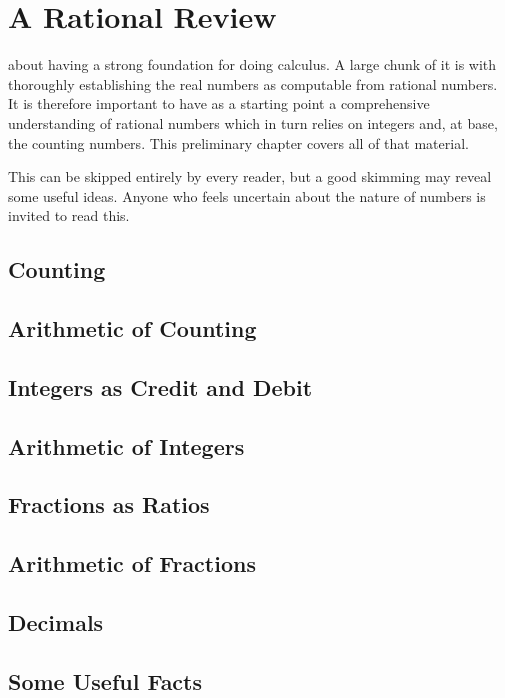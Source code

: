 \chapter*{A Rational Review}

 about having a strong foundation for doing calculus. A large chunk of it is with thoroughly establishing the real numbers as computable from rational numbers. It is therefore important to have as a starting point a comprehensive understanding of rational numbers which in turn relies on integers and, at base, the counting numbers. This preliminary chapter covers all of that material. 

This can be skipped entirely by every reader, but a good skimming may reveal some useful ideas. Anyone who feels uncertain about the nature of numbers is invited to read this. 

\section{Counting}

\section{Arithmetic of Counting}

\section{Integers as Credit and Debit}

\section{Arithmetic of Integers}

\section{Fractions as Ratios}

\section{Arithmetic of Fractions}

\section{Decimals}

\section{Some Useful Facts}
